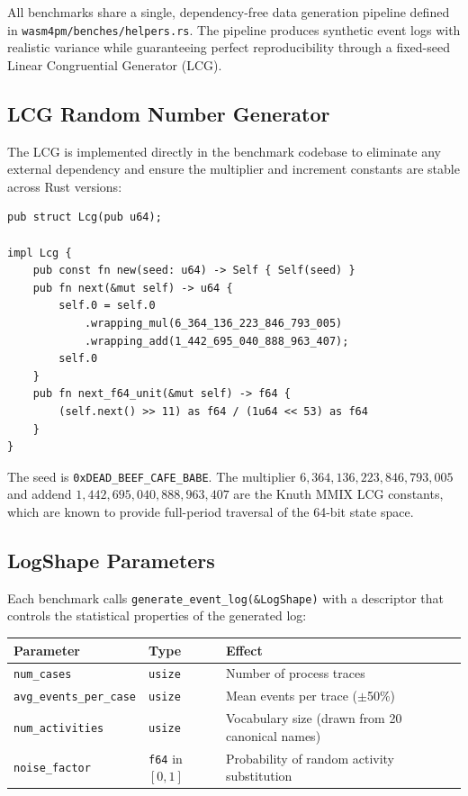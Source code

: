 \documentclass[11pt,a4paper]{article}
\begin{document}
All benchmarks share a single, dependency-free data generation pipeline
defined in \texttt{wasm4pm/benches/helpers.rs}. The pipeline produces
synthetic event logs with realistic variance while guaranteeing perfect
reproducibility through a fixed-seed Linear Congruential Generator (LCG).

\subsection{LCG Random Number Generator}

The LCG is implemented directly in the benchmark codebase to eliminate
any external dependency and ensure the multiplier and increment constants
are stable across Rust versions:

\begin{lstlisting}[caption={LCG implementation in helpers.rs}]
pub struct Lcg(pub u64);

impl Lcg {
    pub const fn new(seed: u64) -> Self { Self(seed) }
    pub fn next(&mut self) -> u64 {
        self.0 = self.0
            .wrapping_mul(6_364_136_223_846_793_005)
            .wrapping_add(1_442_695_040_888_963_407);
        self.0
    }
    pub fn next_f64_unit(&mut self) -> f64 {
        (self.next() >> 11) as f64 / (1u64 << 53) as f64
    }
}
\end{lstlisting}

The seed is \texttt{0xDEAD\_BEEF\_CAFE\_BABE}. The multiplier
$6{,}364{,}136{,}223{,}846{,}793{,}005$ and addend
$1{,}442{,}695{,}040{,}888{,}963{,}407$ are the Knuth MMIX LCG
constants, which are known to provide full-period traversal of the
64-bit state space.

\subsection{LogShape Parameters}

Each benchmark calls \texttt{generate\_event\_log(\&LogShape)} with a
descriptor that controls the statistical properties of the generated log:

\begin{center}
\begin{tabular}{@{}lll@{}}
\toprule
\textbf{Parameter} & \textbf{Type} & \textbf{Effect} \\
\midrule
\texttt{num\_cases} & \texttt{usize} & Number of process traces \\
\texttt{avg\_events\_per\_case} & \texttt{usize} & Mean events per trace ($\pm$50\%) \\
\texttt{num\_activities} & \texttt{usize} & Vocabulary size (drawn from 20 canonical names) \\
\texttt{noise\_factor} & \texttt{f64} in $[0,1]$ & Probability of random activity substitution \\
\bottomrule
\end{tabular}
\end{center}
\end{document}

